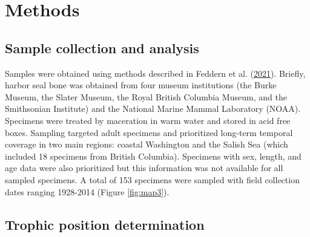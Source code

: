 \documentclass [11pt, proquest] {uwthesis}[2015/03/03]
\begin{document}
\section{Methods}\label{methods-2}

\subsection{Sample collection and
analysis}\label{sample-collection-and-analysis-1}

Samples were obtained using methods described in Feddern et al.
(\protect\hyperlink{ref-Feddern2021}{2021}). Briefly, harbor seal bone
was obtained from four museum institutions (the Burke Museum, the Slater
Museum, the Royal British Columbia Museum, and the Smithsonian
Institute) and the National Marine Mammal Laboratory (NOAA). Specimens
were treated by maceration in warm water and stored in acid free boxes.
Sampling targeted adult specimens and prioritized long-term temporal
coverage in two main regions: coastal Washington and the Salish Sea
(which included 18 specimens from British Columbia). Specimens with sex,
length, and age data were also prioritized but this information was not
available for all sampled specimens. A total of 153 specimens were
sampled with field collection dates ranging 1928-2014 (Figure
\ref{fig:map3}).

\subsection{Trophic position
determination}\label{trophic-position-determination}
\end{document}
